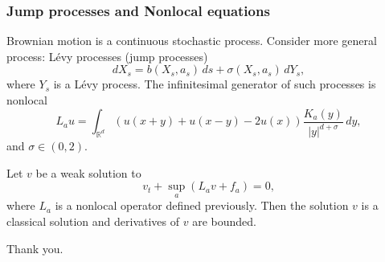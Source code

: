 \documentclass{beamer}
\begin{document}
\begin{frame}
\frametitle{Jump processes and Nonlocal equations}
Brownian motion is a continuous stochastic process. Consider more general process: L\'evy processes (jump processes)
$$dX_s = b(X_s,a_s)\,ds + \sigma(X_s,a_s)\,dY_s,$$
where $Y_s$ is a L\'evy process. The infinitesimal generator of such processes is nonlocal 
$$
L_a u = \int_{\mathbb{R}^d}(u(x+y)+u(x-y)-2u(x))\frac{K_a(y)}{|y|^{d+\sigma}}\,dy,
$$ 
and $\sigma\in(0,2).$
\end{frame}


\begin{frame}
\begin{theorem}
Let $v$ be a weak solution to 
\begin{equation*}
v_t + \sup_a (L_av + f_a) = 0,
\end{equation*}
where $L_a$ is a nonlocal operator defined previously. Then the solution $v$ is a classical solution and derivatives of $v$ are bounded.
\end{theorem}
\end{frame}

\begin{frame}
\center
\huge Thank you.

\end{frame}
\end{document}
